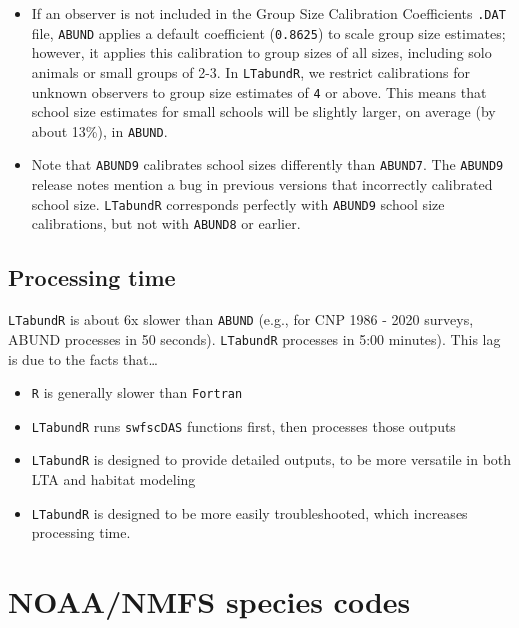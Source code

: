 \documentclass[
]{book}
\begin{document}
\begin{itemize}
\item
  If an observer is not included in the Group Size Calibration Coefficients \texttt{.DAT} file, \texttt{ABUND} applies a default coefficient (\texttt{0.8625}) to scale group size estimates; however, it applies this calibration to group sizes of all sizes, including solo animals or small groups of 2-3. In \texttt{LTabundR}, we restrict calibrations for unknown observers to group size estimates of \texttt{4} or above. This means that school size estimates for small schools will be slightly larger, on average (by about 13\%), in \texttt{ABUND}.
\item
  Note that \texttt{ABUND9} calibrates school sizes differently than \texttt{ABUND7}. The \texttt{ABUND9} release notes mention a bug in previous versions that incorrectly calibrated school size. \texttt{LTabundR} corresponds perfectly with \texttt{ABUND9} school size calibrations, but not with \texttt{ABUND8} or earlier.
\end{itemize}

\hypertarget{processing-time}{%
\section*{Processing time}\label{processing-time}}

\texttt{LTabundR} is about 6x slower than \texttt{ABUND} (e.g., for CNP 1986 - 2020 surveys, ABUND processes in 50 seconds). \texttt{LTabundR} processes in 5:00 minutes). This lag is due to the facts that\ldots{}

\begin{itemize}
\item
  \texttt{R} is generally slower than \texttt{Fortran}
\item
  \texttt{LTabundR} runs \texttt{swfscDAS} functions first, then processes those outputs
\item
  \texttt{LTabundR} is designed to provide detailed outputs, to be more versatile in both LTA and habitat modeling
\item
  \texttt{LTabundR} is designed to be more easily troubleshooted, which increases processing time.
\end{itemize}

\hypertarget{spp_codes}{%
\chapter{NOAA/NMFS species codes}\label{spp_codes}}
\end{document}
